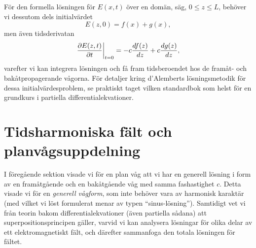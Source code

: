 F{\"o}r den formella l{\"o}sningen f{\"o}r $E(x,t)$ {\"o}ver en dom{\"a}n,
s{\"a}g, $0\le z\le L$, beh{\"o}ver vi dessutom dels initialv{\"a}rdet
$$
  E(z,0) = f(x) + g(x),
$$
men {\"a}ven tidsderivatan
$$
  {{\partial E(z,t)}\over{\partial t}}\bigg|_{t=0}
    = -c{{df(z)}\over{dz}} + c{{dg(z)}\over{dz}},
$$
varefter vi kan integrera l{\"o}sningen och f{\aa} fram tidsberoendet hos de
fram{\aa}t- och bak{\aa}tpropagerande v{\aa}gorna. F{\"o}r detaljer kring
d'Alemberts l{\"o}sningsmetodik f{\"o}r dessa initialv{\"a}rdesproblem, se
praktiskt taget vilken standardbok som helst f{\"o}r en grundkurs i partiella
differentialekvationer.

\section{Tidsharmoniska f{\"a}lt och planv{\aa}gsuppdelning}
I f{\"o}reg{\aa}ende sektion visade vi f{\"o}r en plan v{\aa}g att vi har en
generell l{\"o}sning i form av en fram{\aa}tg{\aa}ende och en
bak{\aa}tg{\aa}ende v{\aa}g med samma fashastighet $c$. Detta visade vi f{\"o}r
en {\it generell v{\aa}gform}, som inte beh{\"o}ver vara av harmonisk
karakt{\"a}r (med vilket vi l{\"o}st formulerat menar av typen
``sinus-l{\"o}sning''). Samtidigt vet vi fr{\aa}n teorin bakom
differentialekvationer ({\"a}ven partiella s{\aa}dana) att
superpositionsprincipen g{\"a}ller, varvid vi kan analysera l{\"o}sningar
f{\"o}r olika delar av ett elektromagnetiskt f{\"a}lt, och d{\"a}refter
sammanfoga den totala l{\"o}sningen f{\"o}r f{\"a}ltet.

